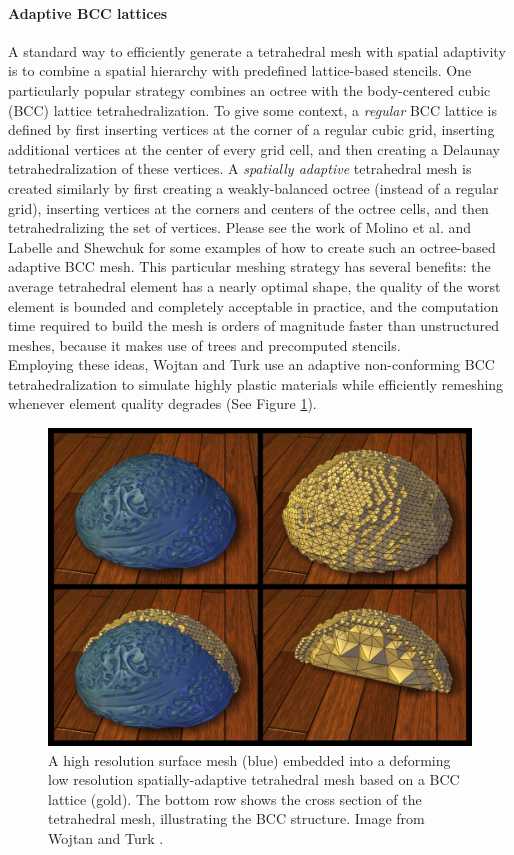 \paragraph*{Adaptive BCC lattices} A standard way to efficiently generate a tetrahedral mesh with spatial adaptivity is to combine a spatial hierarchy with predefined lattice-based stencils. One particularly popular strategy combines an octree with the body-centered cubic (BCC) lattice tetrahedralization. To give some context, a {\em regular} BCC lattice is defined by first inserting vertices at the corner of a regular cubic grid, inserting additional vertices at the center of every grid cell, and then creating a Delaunay tetrahedralization of these vertices. A {\em spatially adaptive} tetrahedral mesh is created similarly by first creating a weakly-balanced octree (instead of a regular grid), inserting vertices at the corners and centers of the octree cells, and then tetrahedralizing the set of vertices. Please see the work of Molino et al. \cite{Molino2003} and Labelle and Shewchuk \cite{Labelle2007} for some examples of how to create such an octree-based adaptive BCC mesh. This particular meshing strategy has several benefits: the average tetrahedral element has a nearly optimal shape, the quality of the worst element is bounded and completely acceptable in practice, and the computation time required to build the mesh is orders of magnitude faster than unstructured meshes, because it makes use of trees and precomputed stencils.
\\
Employing these ideas, Wojtan and Turk \cite{Wojtan2008} use an adaptive non-conforming BCC tetrahedralization to simulate highly plastic materials while efficiently remeshing whenever element quality degrades (See Figure \ref{fig:WT_BCC}). 
\begin{figure}[!h]
	\centering
	\includegraphics[width=0.8\linewidth]{images/starAdaptivity-cgf2016/WT2008_BCC.png}
	\caption[STAR adaptivity: Body-centered cubic mesh]{A high resolution surface mesh (blue) embedded into a deforming low resolution spatially-adaptive tetrahedral mesh based on a BCC lattice (gold). The bottom row shows the cross section of the tetrahedral mesh, illustrating the BCC structure. Image from Wojtan and Turk \cite{Wojtan2008}.}
	\label{fig:WT_BCC}
\end{figure}
